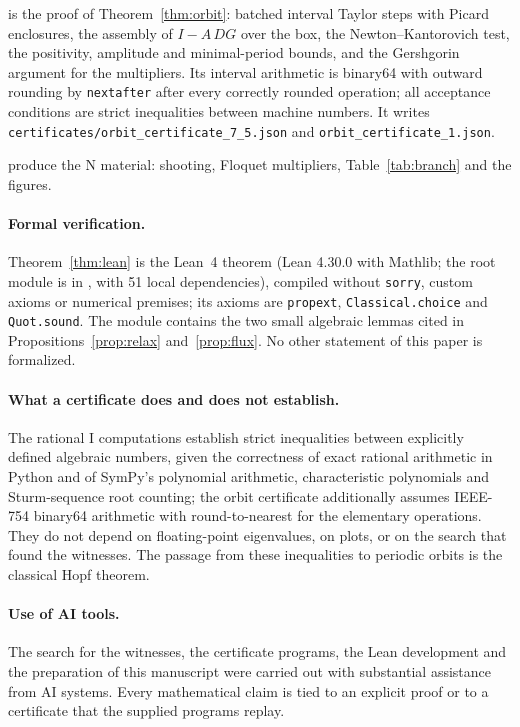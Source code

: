 \documentclass[11pt,a4paper]{article}
\theoremstyle{plain}
\theoremstyle{definition}
\theoremstyle{remark}
\newcommand{\evI}{\textsf{I}}
\newcommand{\evN}{\textsf{N}}
\begin{document}
\begin{description}[leftmargin=1.5em,itemsep=2pt]
\item[\texttt{validate\_orbit.py}] is the proof of Theorem~\ref{thm:orbit}: batched interval Taylor steps with Picard enclosures, the assembly of $I-A\,DG$ over the box, the Newton--Kantorovich test, the positivity, amplitude and minimal-period bounds, and the Gershgorin argument for the multipliers. Its interval arithmetic is binary64 with outward rounding by \texttt{nextafter} after every correctly rounded operation; all acceptance conditions are strict inequalities between machine numbers. It writes \texttt{certificates/orbit\_certificate\_7\_5.json} and \texttt{orbit\_certificate\_1.json}.
\item[\texttt{numerics.py}, \texttt{make\_data.py}, \texttt{make\_region.py}, \texttt{make\_figures.py}] produce the \evN{} material: shooting, Floquet multipliers, Table~\ref{tab:branch} and the figures.
\end{description}

\paragraph{Formal verification.} Theorem~\ref{thm:lean} is the Lean~4 theorem  (Lean 4.30.0 with Mathlib; the root module is  in , with 51 local dependencies), compiled without \texttt{sorry}, custom axioms or numerical premises; its axioms are \texttt{propext}, \texttt{Classical.choice} and \texttt{Quot.sound}. The module  contains the two small algebraic lemmas cited in Propositions~\ref{prop:relax} and~\ref{prop:flux}. No other statement of this paper is formalized.

\paragraph{What a certificate does and does not establish.} The rational \evI{} computations establish strict inequalities between explicitly defined algebraic numbers, given the correctness of exact rational arithmetic in Python and of SymPy's polynomial arithmetic, characteristic polynomials and Sturm-sequence root counting; the orbit certificate additionally assumes IEEE-754 binary64 arithmetic with round-to-nearest for the elementary operations. They do not depend on floating-point eigenvalues, on plots, or on the search that found the witnesses. The passage from these inequalities to periodic orbits is the classical Hopf theorem.

\paragraph{Use of AI tools.} The search for the witnesses, the certificate programs, the Lean development and the preparation of this manuscript were carried out with substantial assistance from AI systems. Every mathematical claim is tied to an explicit proof or to a certificate that the supplied programs replay.




\end{document}
